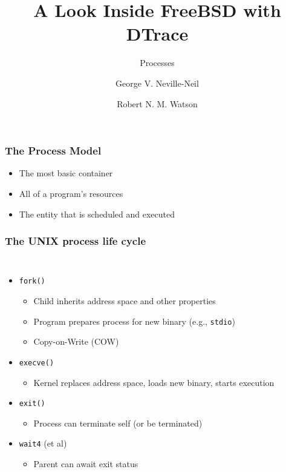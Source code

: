 \documentclass[pdftex]{beamer}
\begin{document}

\title{A Look Inside FreeBSD with DTrace}
\subtitle{Processes}
\author[shortname]{George V. Neville-Neil \and Robert N. M. Watson}

\begin{frame}
  \titlepage
\end{frame}

\begin{frame}
  \frametitle{The Process Model}
  \begin{itemize}
  \item The most basic container
  \item All of a program's resources
  \item The entity that is scheduled and executed
  \end{itemize}
\end{frame}

\begin{frame}[fragile]
  \frametitle{The UNIX process life cycle}

  \begin{columns}[T]
      \vspace{0.5cm}

    \begin{itemize}
      \item \texttt{fork()}
      \begin{itemize}
	\item Child inherits address space and other properties
	\item Program prepares process for new binary (e.g., \texttt{stdio})
	\item Copy-on-Write (COW)
      \end{itemize}
      \pause
      \item \texttt{execve()}
      \begin{itemize}
	\item Kernel replaces address space, loads new binary, starts execution
      \end{itemize}
      \pause
      \item \texttt{exit()}
      \begin{itemize}
	\item Process can terminate self (or be terminated)
      \end{itemize}
      \pause
      \item \texttt{wait4} (et al)
      \begin{itemize}
	\item Parent can await exit status
      \end{itemize}
    \end{itemize}
  \end{columns}
\end{frame}
\end{document}
